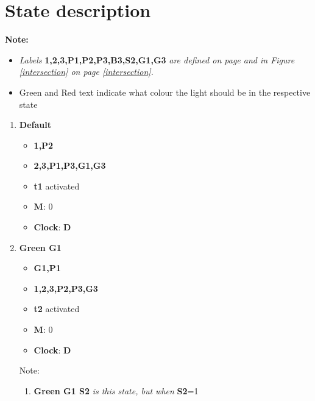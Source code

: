 \documentclass[letterpaper]{article}
\begin{document}
\section{State description}
\textbf{Note: }
\begin{itemize}
 \item \textit{Labels}
       \textbf{1,2,3,P1,P2,P3,B3,S2,G1,G3}
       \textit{are defined on page \pageref{Definitions} and in Figure \ref{intersection} on page \ref{intersection}.}
 \item {\color{green}Green} and {\color{red}Red} text indicate what colour the light should be in the respective state
\end{itemize}

\begin{enumerate}
 \item \textbf{Default}
       \begin{itemize}
        \item {\color{green}\textbf{1,P2}}
        \item {\color{red}\textbf{2,3,P1,P3,G1,G3}}
        \item \textbf{t1} activated
        \item \textbf{M}: 0
        \item \textbf{Clock}: \textbf{D}
       \end{itemize}
 \item \textbf{Green G1}
       \begin{itemize}
        \item {\color{green}\textbf{G1,P1}}
        \item {\color{red}\textbf{1,2,3,P2,P3,G3}}
        \item \textbf{t2} activated
        \item \textbf{M}: 0
        \item \textbf{Clock}: \textbf{D}
       \end{itemize}
       Note:
       \begin{enumerate}
        \item \textbf{Green G1 S2} \textit{is this state, but when} \textbf{S2}=1
       \end{enumerate}
       

\end{enumerate}
\end{document}
